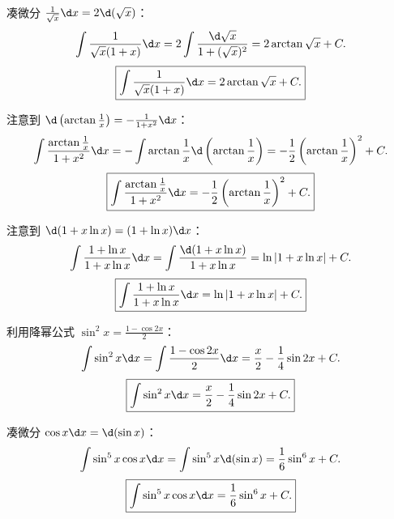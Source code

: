\begin{solution}

    凑微分 $\frac{1}{\sqrt{x}}\d x = 2\d(\sqrt{x})$：
    \begin{equation}
        \int \frac{1}{\sqrt{x}(1 + x)} \d x = 2\int \frac{\d\sqrt{x}}{1 + (\sqrt{x})^2} = 2\arctan\sqrt{x} + C.
    \end{equation}
    \begin{equation}
        \boxed{\int \frac{1}{\sqrt{x}(1 + x)} \d x = 2\arctan\sqrt{x} + C.}
    \end{equation}


    注意到 $\d\left(\arctan \frac{1}{x}\right) = -\frac{1}{1 + x^2}\d x$：
    \begin{equation}
        \int \frac{\arctan \frac{1}{x}}{1 + x^2} \d x = -\int \arctan \frac{1}{x} \d\left( \arctan \frac{1}{x} \right) = -\frac{1}{2}\left( \arctan \frac{1}{x} \right)^2 + C.
    \end{equation}
    \begin{equation}
        \boxed{\int \frac{\arctan \frac{1}{x}}{1 + x^2} \d x = -\frac{1}{2}\left( \arctan \frac{1}{x} \right)^2 + C.}
    \end{equation}


    注意到 $\d(1 + x\ln x) = (1 + \ln x)\d x$：
    \begin{equation}
        \int \frac{1 + \ln x}{1 + x \ln x} \d x = \int \frac{\d(1 + x\ln x)}{1 + x\ln x} = \ln|1 + x\ln x| + C.
    \end{equation}
    \begin{equation}
        \boxed{\int \frac{1 + \ln x}{1 + x \ln x} \d x = \ln|1 + x\ln x| + C.}
    \end{equation}


    利用降幂公式 $\sin^2 x = \frac{1 - \cos 2x}{2}$：
    \begin{equation}
        \int \sin^2 x \d x = \int \frac{1 - \cos 2x}{2} \d x = \frac{x}{2} - \frac{1}{4}\sin 2x + C.
    \end{equation}
    \begin{equation}
        \boxed{\int \sin^2 x \d x = \frac{x}{2} - \frac{1}{4}\sin 2x + C.}
    \end{equation}


    凑微分 $\cos x \d x = \d(\sin x)$：
    \begin{equation}
        \int \sin^5 x \cos x \d x = \int \sin^5 x \d(\sin x) = \frac{1}{6}\sin^6 x + C.
    \end{equation}
    \begin{equation}
        \boxed{\int \sin^5 x \cos x \d x = \frac{1}{6}\sin^6 x + C.}
    \end{equation}
\end{solution}

